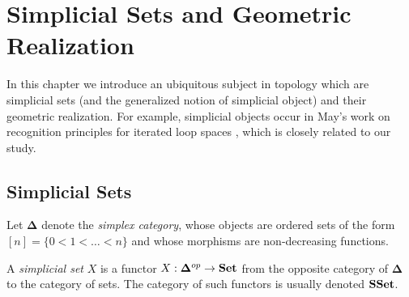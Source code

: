 \documentclass[TFM.tex]{subfiles}
\begin{document}
\chapter{Simplicial Sets and Geometric Realization}\label{ch2}




In this chapter we introduce an ubiquitous subject in topology which are simplicial sets (and the generalized notion of simplicial object) and their geometric realization. For example, simplicial objects occur in May's work on recognition principles for iterated loop spaces \cite{simplicial}, which is closely related to our study.

%
%




\section{Simplicial Sets}

Let $\mathbf{\Delta}$ denote the \emph{simplex category}, whose objects are ordered sets of the form $[n]=\{0<1<\dots< n\}$ and whose morphisms are non-decreasing functions. 

\begin{defi}
A \emph{simplicial set} $X$ is a functor $X:\mathbf{\Delta}^{op}\to\mathrm{\mathbf{Set}}$ from the opposite category of $\mathbf{\Delta}$ to the category of sets. The category of such functors is usually denoted $\mathrm{\mathbf{SSet}}$. 
\end{defi}
\end{document}
